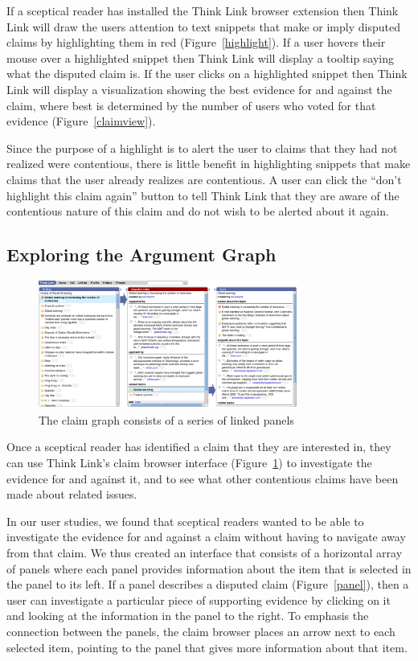 \documentclass{chi2009}
\newcommand{\todo}[1]{}
\begin{document}
If a sceptical reader has installed the Think Link browser extension then Think Link will draw the users attention to text snippets that make or imply disputed claims by highlighting them in red (Figure~\ref{highlight}). If a user hovers their mouse over a highlighted snippet then Think Link will display a tooltip saying what the disputed claim is. If the user clicks on a highlighted snippet then Think Link will display a visualization showing the best evidence for and against the claim, where best is determined by the number of users who voted for that evidence (Figure~\ref{claimview}).

Since the purpose of a highlight is to alert the user to claims that they had not realized were contentious, there is little benefit in highlighting snippets that make claims that the user already realizes are contentious. A user can click the ``don't highlight this claim again'' button to tell Think Link that they are aware of the contentious nature of this claim and do not wish to be alerted about it again.

\todo{ignore button}
\todo{talk about the margin?}

\subsection{Exploring the Argument Graph}

\begin{figure}[tb]
	\begin{center}
	\includegraphics[width=8.5cm]{../screenshots/v2_panels.png}
	\caption{The claim graph consists of a series of linked panels}
	\label{panels}
	\end{center}
\end{figure}

Once a sceptical reader has identified a claim that they are interested in, they can use Think Link's claim browser interface (Figure~\ref{panels}) to investigate the evidence for and against it, and to see what other contentious claims have been made about related issues. 

In our user studies, we found that sceptical readers wanted to be able to investigate the evidence for and against a claim without having to navigate away from that claim. We thus created an interface that consists of a horizontal array of panels where each panel provides information about the item that is selected in the panel to its left. If a panel describes a disputed claim (Figure~\ref{panel}), then a user can investigate a particular piece of supporting evidence by clicking on it and looking at the information in the panel to the right. To emphasis the connection between the panels, the claim browser places an arrow next to each selected item, pointing to the panel that gives more information about that item.
\end{document}
